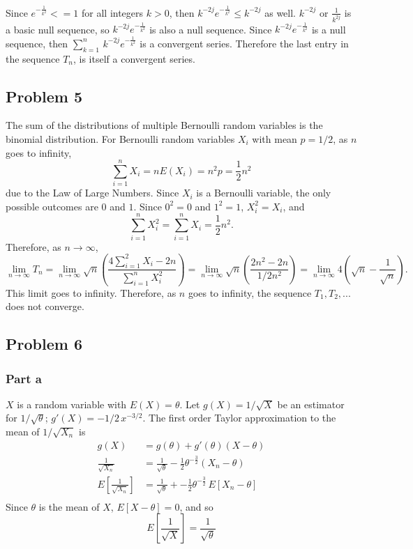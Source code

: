 \documentclass{article}
\begin{document}
Since $e^{-\frac{1}{k^2}} <= 1 $ for all integers $k > 0$, then $k^{-2j}e^{-\frac{1}{k^2}} \leq k^{-2j}$ as well. $k^{-2j}$ or $\frac{1}{k^{2j}}$ is a basic null sequence, so $k^{-2j}e^{-\frac{1}{k^2}}$ is also a null sequence. Since $k^{-2j}e^{-\frac{1}{k^2}}$ is a null sequence, then  $\sum_{k=1}^{n}\, k^{-2j}e^{-\frac{1}{k^2}}$ is a convergent series. Therefore the last entry in the sequence $T_n$, is itself a convergent series. 
\fi

\subsection*{Problem 5}
The sum of the distributions of multiple Bernoulli random variables is the binomial distribution. For Bernoulli random variables $X_i$ with mean $p = 1/2$, as $n$ goes to infinity, \[\sum_{i=1}^n X_i = nE(X_i) = n^2p = \frac{1}{2}n^2\] due to the Law of Large Numbers. Since $X_i$ is a Bernoulli variable, the only possible outcomes are $0$ and $1$. Since $0^2=0$ and $1^2=1$, $X_i^2 = X_i$, and \[\sum_{i=1}^n X_i^2 = \sum_{i=1}^n X_i = \frac{1}{2}n^2.\] Therefore, as $n\to\infty$, \[\lim_{n\to\infty}T_n = \lim_{n\to\infty}\sqrt{n}\left(\frac{4\sum_{i=1}^2 X_i - 2n}{\sum_{i=1}^n X_i^2}\right) =\lim_{n\to\infty} \sqrt{n}\left(\frac{2n^2-2n}{1/2n^2}\right) = \lim_{n\to\infty}4\left(\sqrt{n} - \frac{1}{\sqrt{n}}\right).\]
This limit goes to infinity. Therefore, as $n$ goes to infinity, the sequence  $T_1, T_2, ...$ does not converge. 

\subsection*{Problem 6}
\subsubsection*{Part a}
$X$ is a random variable with $E(X) = \theta$. Let $g(X) = 1/\sqrt{X}$ be an estimator for $1/\sqrt{\theta}$; $g'(X) = -1/2\,x^{-3/2}.$ The first order Taylor approximation to the mean of $1/\sqrt{X_n}$ is
\[\begin{aligned}
g(X) &= g(\theta)+g'(\theta)(X-\theta) \\
\frac{1}{\sqrt{X_n}} &= \frac{1}{\sqrt{\theta}} -\frac{1}{2}\theta^{-\frac{3}{2}}(X_n - \theta) \\
E\left[\frac{1}{\sqrt{X_n}}\right] &= \frac{1}{\sqrt{\theta}} + -\frac{1}{2}\theta^{-\frac{3}{2}}\,E\left[X_n - \theta\right] \\
\end{aligned}\]
Since $\theta$ is the mean of $X$, $E[X-\theta] = 0$, and so 
\[E\left[\frac{1}{\sqrt{X}}\right] = \frac{1}{\sqrt{\theta}}\]
\end{document}
